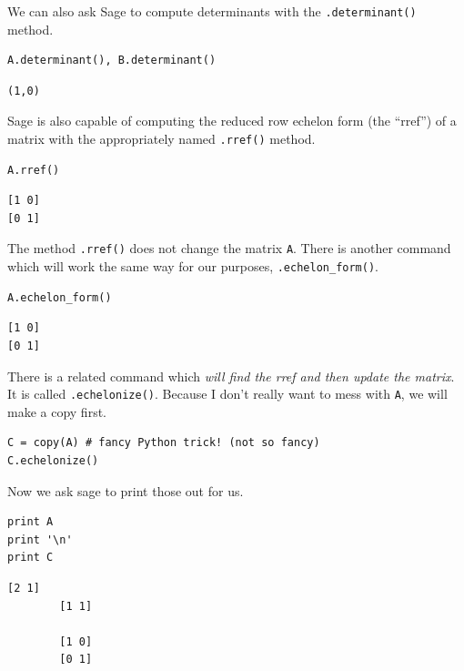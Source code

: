 \documentclass[10pt,]{book}
\theoremstyle{plain}
\numberwithin{equation}{section}
\begin{document}
      We can also ask Sage to compute determinants with the \verb?.determinant()?
      method.
\begin{lstlisting}[style=sageinput]
A.determinant(), B.determinant()
\end{lstlisting}
\begin{lstlisting}[style=sageoutput]
(1,0)
\end{lstlisting}
\par

      Sage is also capable of computing the reduced row echelon form
      (the ``rref'') of a matrix with the appropriately named \verb?.rref()?
      method.
\begin{lstlisting}[style=sageinput]
A.rref()
\end{lstlisting}
\begin{lstlisting}[style=sageoutput]
[1 0]
[0 1]
\end{lstlisting}
\par

      The method \verb?.rref()? does not change the matrix \verb?A?. There is
      another command which will work the same way for our purposes,
      \verb?.echelon_form()?.
\begin{lstlisting}[style=sageinput]
A.echelon_form()
\end{lstlisting}
\begin{lstlisting}[style=sageoutput]
[1 0]
[0 1]
\end{lstlisting}
\par

      There is a related command which \emph{will find the rref and then update the
      matrix}. It is called \verb?.echelonize()?.
      Because I don't really want to mess with \verb?A?, we will
      make a copy first.
\begin{lstlisting}[style=sageinput]
C = copy(A) # fancy Python trick! (not so fancy)
C.echelonize()
\end{lstlisting}
\par

      Now we ask sage to print those out for us.
\begin{lstlisting}[style=sageinput]
print A
print '\n'
print C
\end{lstlisting}
\begin{lstlisting}[style=sageoutput]
        [2 1]
        [1 1]

        [1 0]
        [0 1]
\end{lstlisting}
\par
\end{document}
